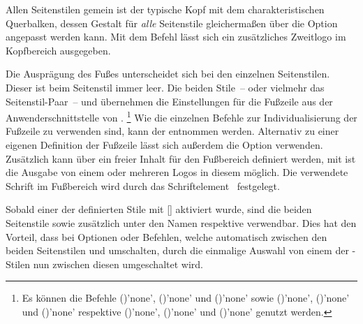 \begin{Declaration*}{}
\begin{Declaration*}{}
\begin{Declaration*}{}
\begin{Declaration}[v2.02]{}
\begin{Declaration}[v2.02]{}
\begin{Declaration}[v2.02]{}
Allen Seitenstilen gemein ist der typische Kopf mit dem charakteristischen 
Querbalken, dessen Gestalt für \emph{alle} Seitenstile gleichermaßen über die 
Option  angepasst werden kann. Mit dem Befehl  
lässt sich ein zusätzliches Zweitlogo im Kopfbereich ausgegeben.

Die Ausprägung des Fußes unterscheidet sich bei den einzelnen Seitenstilen. 
Dieser ist beim Seitenstil  immer leer. Die beiden 
Stile~-- oder vielmehr das Seitenstil-Paar~--  und 
 übernehmen die Einstellungen für die Fußzeile aus 
der Anwenderschnittstelle von .%
\footnote{%
  Es können die Befehle
  ()'none', 
  ()'none' und 
  ()'none' sowie 
  ()'none', 
  ()'none' und 
  ()'none' respektive 
  ()'none', 
  ()'none' und 
  ()'none'
  genutzt werden.
}
Wie die einzelnen Befehle zur Individualisierung der Fußzeile zu verwenden 
sind, kann der  entnommen werden. Alternativ 
zu einer eigenen Definition der Fußzeile lässt sich außerdem die Option 
 verwenden. Zusätzlich kann über  ein freier 
Inhalt für den Fußbereich definiert werden, mit  ist die 
Ausgabe von einem oder mehreren Logos in diesem möglich. Die verwendete Schrift 
im Fußbereich wird durch das Schriftelement~ festgelegt.

Sobald einer der definierten Stile mit [] 
aktiviert wurde, sind die beiden Seitenstile  sowie 
 zusätzlich unter den Namen  
respektive  verwendbar. Dies hat den Vorteil, dass bei 
Optionen oder Befehlen, welche automatisch zwischen den beiden Seitenstilen 
 und  umschalten, durch die einmalige 
Auswahl von einem der -Stilen nun zwischen diesen 
umgeschaltet wird.


\end{Declaration}
\end{Declaration}
\end{Declaration}
\end{Declaration*}
\end{Declaration*}
\end{Declaration*}
